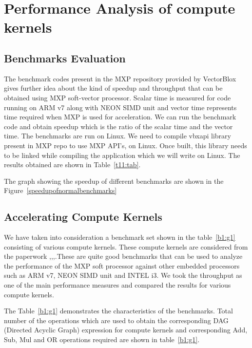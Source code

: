 \newpage
\chapter{Performance Analysis of compute kernels}

\section{Benchmarks Evaluation}

The benchmark codes present in the MXP repository provided by VectorBlox gives further idea about the kind of speedup and throughput that can be obtained using MXP soft-vector processor. Scalar time is measured for code running on ARM v7 along with NEON SIMD unit and vector time represents time required when MXP is used for acceleration. We can run the benchmark code and obtain speedup which is the ratio of the scalar time and the vector time. The benchmarks are run on Linux. We need to compile vbxapi library present in MXP repo to use MXP API’s, on Linux.  Once built, this library needs to be linked while compiling the application which we will write on Linux. The results obtained are shown in Table~\ref{t11:tab}.





The graph showing the speedup of different benchmarks are shown in the Figure~\ref{speedupofnormalbenchmarks}




\section{Accelerating Compute Kernels}
We have taken into consideration a benchmark set shown in the table~\ref{b1:g1} consisting of various compute kernels. These compute kernels are considered from the paperwork \cite{20},\cite{21},\cite{22},\cite{23}.These are quite good benchmarks that can be used to analyze the performance of the MXP soft processor against other embedded processors such as ARM v7, NEON SIMD unit and INTEL i3. We took the throughput as one of the main performance measures and compared the results for various compute kernels.




The Table~\ref{b1:g1} demonstrates the characteristics of the benchmarks. Total number of the operations which are used to obtain the corresponding DAG (Directed Acyclic Graph) expression for compute kernels and corresponding Add, Sub, Mul and OR operations required are shown in table~\ref{b1:g1}. 


